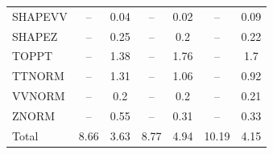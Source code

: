 \begin{table}[H]
\begin{center}
\begin{footnotesize}
\begin{tabular}{lcccccc}
				SHAPEVV & -- &  0.04 & -- &  0.02 & -- &  0.09 \\
				SHAPEZ & -- &  0.25 & -- &  0.2 & -- &  0.22 \\
				TOPPT & -- &  1.38 & -- &  1.76 & -- &  1.7 \\
				TTNORM & -- &  1.31 & -- &  1.06 & -- &  0.92 \\
				VVNORM & -- &  0.2 & -- &  0.2 & -- &  0.21 \\
				ZNORM & -- &  0.55 & -- &  0.31 & -- &  0.33 \\
				Total &  8.66  &  3.63 &  8.77  &  4.94 &  10.19  &  4.15 \\ \hline \hline
			\end{tabular}
			\label{tab:SysUncertainties_300}
        \end{footnotesize}
	\end{center}
\end{table}


